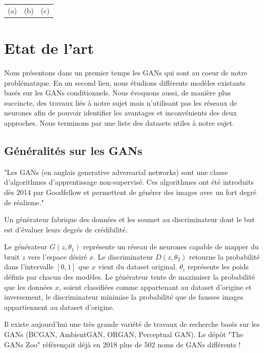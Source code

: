 \documentclass[a4paper, 12pt]{report}
\begin{document}
\begin{center}
\begin{tabular}{ccc}
    (a)&(b)&(c)
  \end{tabular}
\end{center}



\chapter{Etat de l'art}
 
Nous présentons dans un premier temps les GANs qui sont au coeur de notre problématique. En un second lieu, nous étudions différents modèles existants basés sur les GANs conditionnels. Nous évoquons aussi, de manière plus succincte, des travaux liés à notre sujet mais n'utilisant pas les réseaux de neurones afin de pouvoir identifier les avantages et inconvénients des deux approches. Nous terminons par une liste des datasets utiles à notre sujet.


\section{Généralités sur les GANs}

"Les GANs (en anglais generative adversarial networks) sont une classe d'algorithmes d'apprentissage non-supervisé. Ces algorithmes ont été introduits dès 2014 par Goodfellow et permettent de générer des images avec un fort degré de réalisme." \cite{wiki:Reseaux-antagonistes-generatifs}

Un générateur fabrique des données et les soumet au discriminateur dont le but est d'évaluer leurs degrés de crédibilité. 

Le générateur $G(z, \theta_{1})$ représente un réseau de neurones capable de mapper du bruit $z$ vers l'espace désiré $x$. Le discriminateur $D(z, \theta_{2})$ retourne la probabilité dans l'intervalle $[0,1]$ que $x$ vient du dataset original. $\theta_{i}$ représente les poids définis par chacun des modèles. Le générateur tente de maximiser la probabilité que les données $x$, soient classifiées comme appartenant au dataset d'origine et inversement, le discriminateur minimise la probabilité que de fausses images appartiennent au dataset d'origine.

Il existe aujourd'hui une très grande variété de travaux de recherche basés sur les GANs (BCGAN, AmbientGAN, ORGAN, Perceptual GAN). Le dépôt "The GANs Zoo" \cite{hindupuravinash} référençait déjà en 2018 plus de 502 noms de GANs différents !
\end{document}
